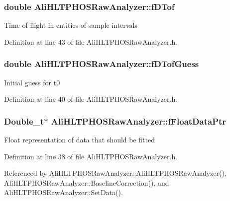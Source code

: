 \subsubsection{\setlength{\rightskip}{0pt plus 5cm}double {\bf Ali\-HLTPHOSRaw\-Analyzer::f\-DTof}\hspace{0.3cm}{\tt  [protected, inherited]}}\label{classAliHLTPHOSRawAnalyzer_AliHLTPHOSRawAnalyzerPeakFinderp5}


Time of flight in entities of sample intervals 

Definition at line 43 of file Ali\-HLTPHOSRaw\-Analyzer.h.
\subsubsection{\setlength{\rightskip}{0pt plus 5cm}double {\bf Ali\-HLTPHOSRaw\-Analyzer::f\-DTof\-Guess}\hspace{0.3cm}{\tt  [protected, inherited]}}\label{classAliHLTPHOSRawAnalyzer_AliHLTPHOSRawAnalyzerPeakFinderp2}


Initial guess for t0 

Definition at line 40 of file Ali\-HLTPHOSRaw\-Analyzer.h.
\subsubsection{\setlength{\rightskip}{0pt plus 5cm}Double\_\-t$\ast$ {\bf Ali\-HLTPHOSRaw\-Analyzer::f\-Float\-Data\-Ptr}\hspace{0.3cm}{\tt  [protected, inherited]}}\label{classAliHLTPHOSRawAnalyzer_AliHLTPHOSRawAnalyzerPeakFinderp0}


Float representation of data that should be fitted 

Definition at line 38 of file Ali\-HLTPHOSRaw\-Analyzer.h.

Referenced by Ali\-HLTPHOSRaw\-Analyzer::Ali\-HLTPHOSRaw\-Analyzer(), Ali\-HLTPHOSRaw\-Analyzer::Baseline\-Correction(), and Ali\-HLTPHOSRaw\-Analyzer::Set\-Data().
